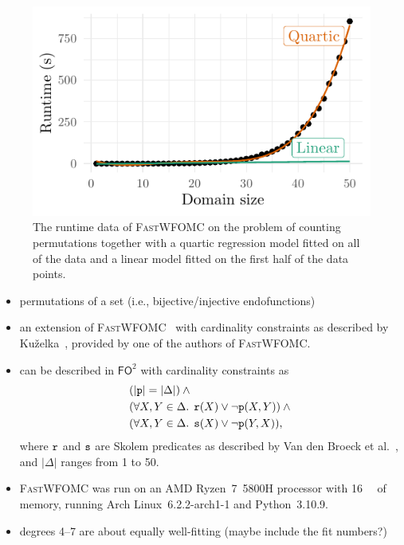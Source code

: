 \documentclass{article}
\newcommand{\FOtwo}{$\mathsf{FO}^{2}$}
\newcommand{\predicate}{\texttt{\textup{p}}}
\newcommand{\predicates}{\texttt{\textup{s}}}
\newcommand{\predicater}{\texttt{\textup{r}}}
\begin{document}
\begin{figure}[t]
  \includegraphics{plot}
  \caption{The runtime data of \textsc{FastWFOMC} on the problem of counting
    permutations together with a quartic regression model fitted on all of the
    data and a linear model fitted on the first half of the data points.}
\end{figure}

\begin{itemize}
  \item permutations of a set (i.e., bijective/injective endofunctions)
  \item an extension of \textsc{FastWFOMC}~\cite{DBLP:conf/uai/BremenK21} with
        cardinality constraints as described by
        Ku\v{z}elka~, provided by one of
        the authors of \textsc{FastWFOMC}.
  \item can be described in \FOtwo{} with cardinality constraints as
  \begin{align*}
    &(|\predicate| = |\Delta|) \land{}\\
    &(\forall X, Y \in \Delta\text{. } \predicater(X) \lor \neg \predicate(X, Y)) \land{}\\
    &(\forall X, Y \in \Delta\text{. } \predicates(X) \lor \neg\predicate(Y, X)),
  \end{align*}
        where $\predicater$ and $\predicates$ are Skolem predicates as described
        by Van den Broeck et al.~, and
        $|\Delta|$ ranges from 1 to 50.
  \item \textsc{FastWFOMC} was run on an AMD Ryzen~7~5800H processor with
        \SI{16}{\giga\byte} of memory, running Arch Linux~6.2.2-arch1-1 and
        Python~3.10.9.
  \item degrees 4--7 are about equally well-fitting (maybe include the fit
        numbers?)
\end{itemize}
\end{document}
